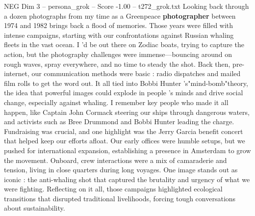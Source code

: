 \begin{textsample}{NEG Dim 3 – persona\_grok – Score -1.00 – t272\_grok.txt}  \label{ex:f3_neg_023}
Looking back through a dozen photographs from my time as a Greenpeace \textbf{photographer} between 1974 and 1982 brings back a flood of memories.
Those years were filled with intense campaigns, starting with our confrontations against Russian whaling fleets in the vast ocean.
I 'd be out there on Zodiac boats, trying to capture the action, but the photography challenges were immense—bouncing around on rough waves, spray everywhere, and no time to steady the shot.
Back then, pre-internet, our communication methods were basic : radio dispatches and mailed film rolls to get the word out.
It all tied into Bobbi Hunter 's"mind-bomb"theory, the idea that powerful images could explode in people 's minds and drive social change, especially against whaling.
I remember key people who made it all happen, like Captain John Cormack steering our ships through dangerous waters, and activists such as Bree Drummond and Bobbi Hunter leading the charge.
Fundraising was crucial, and one highlight was the Jerry Garcia benefit concert that helped keep our efforts afloat.
Our early offices were humble setups, but we pushed for international expansion, establishing a presence in Amsterdam to grow the movement.
Onboard, crew interactions were a mix of camaraderie and tension, living in close quarters during long voyages.
One image stands out as iconic : the anti-whaling shot that captured the brutality and urgency of what we were fighting.
Reflecting on it all, those campaigns highlighted ecological transitions that disrupted traditional livelihoods, forcing tough conversations about sustainability.

\end{textsample}
